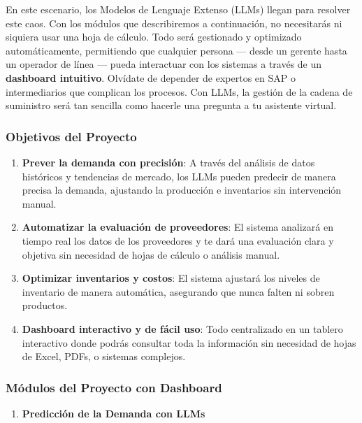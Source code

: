 \documentclass[
  10pt,
  letterpaper,
]{book}
\providecommand{\tightlist}{%
  \setlength{\itemsep}{0pt}\setlength{\parskip}{0pt}}\usepackage{longtable,booktabs,array}
\begin{document}
En este escenario, los Modelos de Lenguaje Extenso (LLMs) llegan para
resolver este caos. Con los módulos que describiremos a continuación, no
necesitarás ni siquiera usar una hoja de cálculo. Todo será gestionado y
optimizado automáticamente, permitiendo que cualquier persona --- desde
un gerente hasta un operador de línea --- pueda interactuar con los
sistemas a través de un \textbf{dashboard intuitivo}. Olvídate de
depender de expertos en SAP o intermediarios que complican los procesos.
Con LLMs, la gestión de la cadena de suministro será tan sencilla como
hacerle una pregunta a tu asistente virtual.

\subsubsection{Objetivos del Proyecto}\label{objetivos-del-proyecto-1}

\begin{enumerate}
\def\labelenumi{\arabic{enumi}.}
\tightlist
\item
  \textbf{Prever la demanda con precisión}: A través del análisis de
  datos históricos y tendencias de mercado, los LLMs pueden predecir de
  manera precisa la demanda, ajustando la producción e inventarios sin
  intervención manual.
\item
  \textbf{Automatizar la evaluación de proveedores}: El sistema
  analizará en tiempo real los datos de los proveedores y te dará una
  evaluación clara y objetiva sin necesidad de hojas de cálculo o
  análisis manual.
\item
  \textbf{Optimizar inventarios y costos}: El sistema ajustará los
  niveles de inventario de manera automática, asegurando que nunca
  falten ni sobren productos.
\item
  \textbf{Dashboard interactivo y de fácil uso}: Todo centralizado en un
  tablero interactivo donde podrás consultar toda la información sin
  necesidad de hojas de Excel, PDFs, o sistemas complejos.
\end{enumerate}

\subsubsection{Módulos del Proyecto con
Dashboard}\label{muxf3dulos-del-proyecto-con-dashboard}

\begin{enumerate}
\def\labelenumi{\arabic{enumi}.}
\tightlist
\item
  \textbf{Predicción de la Demanda con LLMs}
\end{enumerate}
\end{document}
